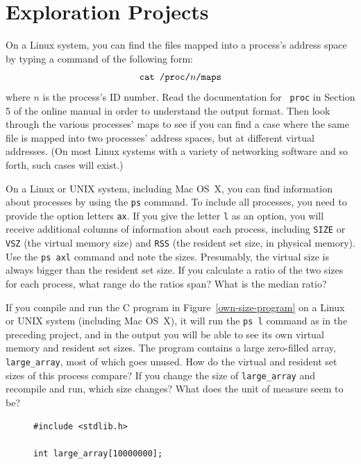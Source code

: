\section*{Exploration Projects}
\begin{chapterEnumerate}
\item
\label{maps-exercise}
On a Linux system, you can find the files mapped into a process's
address space by typing a command of the following form:
\[\mbox{\tt cat /proc/}n\mbox{\tt /maps}\]
where $n$ is the process's ID number.  Read the documentation for {\tt
  proc} in Section 5 of the online manual in order to understand the
  output format.  Then look through the various processes' maps to
  see if you can find a case where the same file is mapped into two processes'
  address spaces, but at different virtual addresses.  (On most Linux
  systems with a variety of networking software and so forth, such cases will
  exist.)
\item
On a Linux or UNIX system, including Mac OS~X, you can find information about processes by
using the \verb|ps| command.  To include all processes, you need to
provide the option letters \verb|ax|.  If you give the letter \verb|l| as an
option, you will receive additional columns of information about each
process, including \verb|SIZE| or \verb|VSZ| (the virtual memory size)
and \verb|RSS| (the resident set size, in physical memory).  Use the
\verb|ps axl|
command and note the sizes.  Presumably, the virtual size is always
bigger than the resident set size.  If you calculate a ratio of the
two sizes for each process, what range do the ratios span?  What is
the median ratio?
\item
If you compile and run the C program in Figure~\ref{own-size-program} on a Linux or UNIX
system (including Mac OS~X), it will run the \verb|ps l| command as in the preceding
project, and in the output you will be able to see its own virtual
memory and resident set sizes.  The program contains a large
zero-filled array, \verb|large_array|, most of which goes unused.  How do the
virtual and resident set sizes of this process compare?  If you change
the size of \verb|large_array| and recompile and run, which size changes?  What does
the unit of measure seem to be?
\begin{figure}
\begin{verbatim}
#include <stdlib.h>

int large_array[10000000];


\end{verbatim}
\end{figure}
\end{chapterEnumerate}
